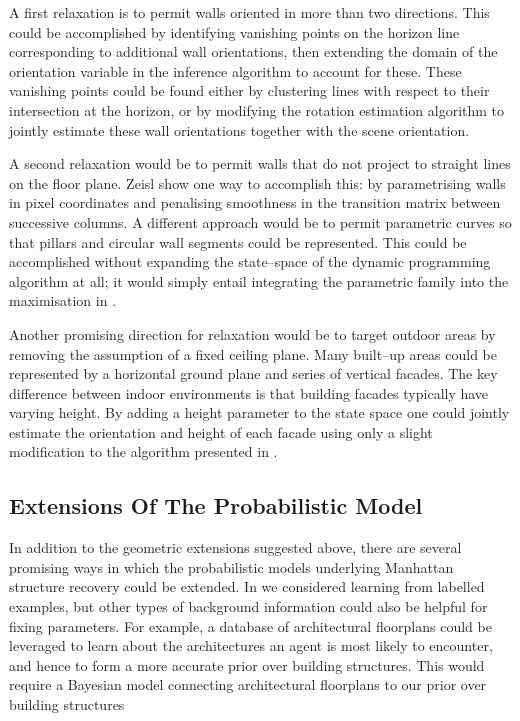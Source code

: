 A first relaxation is to permit walls oriented in more than two
directions. This could be accomplished by identifying vanishing
points on the horizon line corresponding to additional wall
orientations, then extending the domain of the orientation variable in
the inference algorithm to account for these. These vanishing points
could be found either by clustering lines with respect to their
intersection at the horizon, or by modifying the rotation estimation
algorithm to jointly estimate these wall orientations together with
the scene orientation.

A second relaxation would be to permit walls that do not project to
straight lines on the floor plane. Zeisl \etal \cite{Zeisl2011} show
one way to accomplish this: by parametrising walls in pixel
coordinates and penalising smoothness in the transition matrix between
successive columns. A different approach would be to permit parametric
curves so that pillars and circular wall segments could be
represented. This could be accomplished without expanding the
state--space of the dynamic programming algorithm at all; it would
simply entail integrating the parametric family into the maximisation
in .\changedsinceviva

Another promising direction for relaxation would be to target outdoor
areas by removing the assumption of a fixed ceiling plane. Many
built--up areas could be represented by a horizontal ground plane and
series of vertical facades. The key difference between indoor
environments is that building facades typically have varying
height. By adding a height parameter to the state space one could
jointly estimate the orientation and height of each facade using only
a slight modification to the algorithm presented in
.

\subsection{Extensions Of The Probabilistic Model}

In addition to the geometric extensions suggested above, there are
several promising ways in which the probabilistic models underlying
Manhattan structure recovery could be extended. In 
we considered learning from labelled examples, but other types of
background information could also be helpful for fixing
parameters. For example, a database of architectural floorplans could
be leveraged to learn about the architectures an agent is most likely
to encounter, and hence to form a more accurate prior over building
structures. This would require a Bayesian model connecting
architectural floorplans to our prior over building structures


